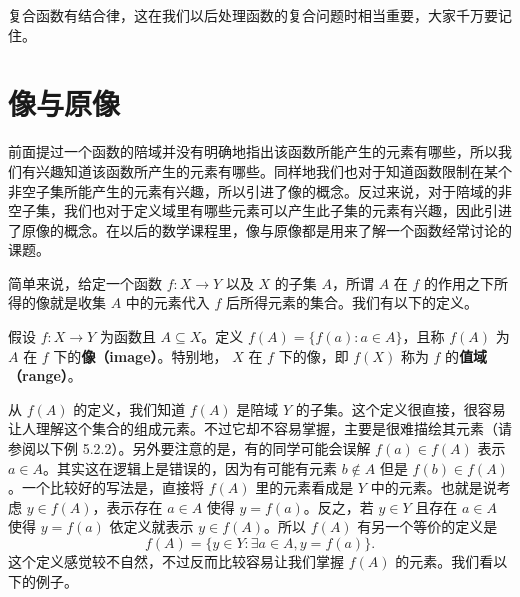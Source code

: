 复合函数有结合律，这在我们以后处理函数的复合问题时相当重要，大家千万要记住。

\section{像与原像}

前面提过一个函数的陪域并没有明确地指出该函数所能产生的元素有哪些，所以我们有兴趣知道该函数所产生的元素有哪些。同样地我们也对于知道函数限制在某个非空子集所能产生的元素有兴趣，所以引进了像的概念。反过来说，对于陪域的非空子集，我们也对于定义域里有哪些元素可以产生此子集的元素有兴趣，因此引进了原像的概念。在以后的数学课程里，像与原像都是用来了解一个函数经常讨论的课题。

简单来说，给定一个函数 $f : X \to Y$ 以及 $X$ 的子集 $A$，所谓 $A$ 在 $f$ 的作用之下所得的像就是收集 $A$ 中的元素代入 $f$ 后所得元素的集合。我们有以下的定义。

\begin{definition}
假设 $f : X \to Y$ 为函数且 $A \subseteq X$。定义 $f(A) = \{f(a) : a \in A\}$，且称 $f(A)$ 为 $A$ 在 $f$ 下的{\bf 像（image）}。特别地， $X$ 在 $f$ 下的像，即 $f(X)$ 称为 $f$ 的{\bf 值域（range）}。
\end{definition}

从 $f(A)$ 的定义，我们知道 $f(A)$ 是陪域 $Y$ 的子集。这个定义很直接，很容易让人理解这个集合的组成元素。不过它却不容易掌握，主要是很难描绘其元素（请参阅以下例 5.2.2）。另外要注意的是，有的同学可能会误解 $f(a) \in f(A)$ 表示 $a \in A$。其实这在逻辑上是错误的，因为有可能有元素 $b \notin A$ 但是 $f(b) \in f(A)$。一个比较好的写法是，直接将 $f(A)$ 里的元素看成是 $Y$ 中的元素。也就是说考虑 $y \in f(A)$，表示存在 $a \in A$ 使得 $y = f(a)$。反之，若 $y \in Y$ 且存在 $a \in A$ 使得 $y = f(a)$ 依定义就表示 $y \in f(A)$。所以 $f(A)$ 有另一个等价的定义是
$$ f(A) = \{y \in Y : \exists a \in A, y = f(a)\}. $$
这个定义感觉较不自然，不过反而比较容易让我们掌握 $f(A)$ 的元素。我们看以下的例子。

